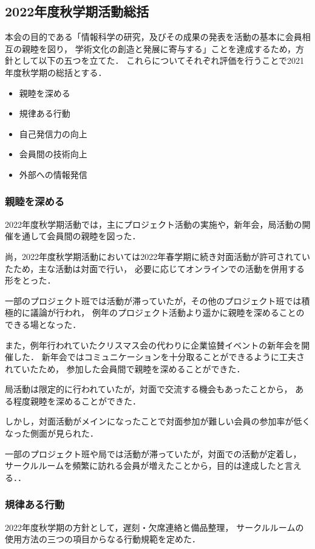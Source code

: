 \subsection*{2022年度秋学期活動総括}


本会の目的である「情報科学の研究，及びその成果の発表を活動の基本に会員相互の親睦を図り，
学術文化の創造と発展に寄与する」ことを達成するため，方針として以下の五つを立てた．
これらについてそれぞれ評価を行うことで2021年度秋学期の総括とする．

\begin{itemize}
    \item 親睦を深める
    \item 規律ある行動
    \item 自己発信力の向上
    \item 会員間の技術向上
    \item 外部への情報発信
\end{itemize}

\subsubsection*{親睦を深める}
    2022年度秋学期活動では，主にプロジェクト活動の実施や，新年会，局活動の開催を通して会員間の親睦を図った．

    尚，2022年度秋学期活動においては2022年春学期に続き対面活動が許可されていたため，主な活動は対面で行い，
    必要に応じてオンラインでの活動を併用する形をとった．

    一部のプロジェクト班では活動が滞っていたが，その他のプロジェクト班では積極的に議論が行われ，
    例年のプロジェクト活動より遥かに親睦を深めることのできる場となった．

    また，例年行われていたクリスマス会の代わりに企業協賛イベントの新年会を開催した．
    新年会ではコミュニケーションを十分取ることができるように工夫されていたため，
    参加した会員間で親睦を深めることができた．
    
    局活動は限定的に行われていたが，対面で交流する機会もあったことから，
    ある程度親睦を深めることができた．
    
    しかし，対面活動がメインになったことで対面参加が難しい会員の参加率が低くなった側面が見られた．

    一部のプロジェクト班や局では活動が滞っていたが，対面での活動が定着し，
    サークルルームを頻繁に訪れる会員が増えたことから，目的は達成したと言える．．

\subsubsection*{規律ある行動}
    2022年度秋学期の方針として，遅刻・欠席連絡と備品整理，
    サークルルームの使用方法の三つの項目からなる行動規範を定めた．
    
